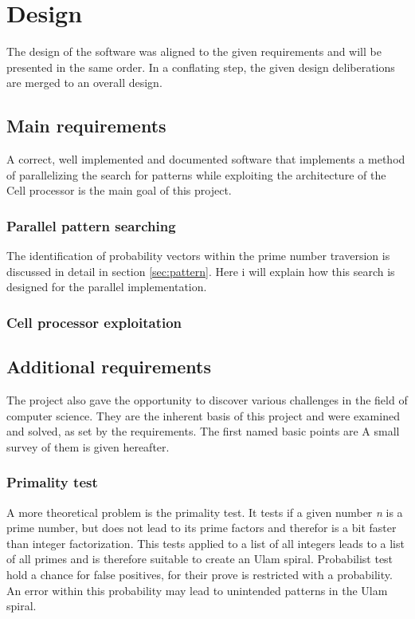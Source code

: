 \section{Design}
\label{sec:design}
The design of the software was aligned to the given requirements and will be presented in the same order. In a conflating step, the given design deliberations are merged to an overall design.

\subsection{Main requirements}
\label{sec:main_req}
A correct, well implemented and documented software that implements a method of parallelizing the search for patterns while exploiting the architecture of the Cell processor is the main goal of this project.

\subsubsection{Parallel pattern searching}
\label{sec:parallel_search}
The identification of probability vectors within the prime number traversion is discussed in detail in section \ref{sec:pattern}. Here i will explain how this search is designed for the parallel implementation.




\subsubsection{Cell processor exploitation}
\label{sec:cell_exploit}

\subsection{Additional requirements}
\label{sec:additional_req}
The project also gave the opportunity to discover various challenges in the field of computer science. They are the inherent basis of this project and were examined and solved, as set by the requirements. The first named basic points are A small survey of them is given hereafter.

\subsubsection{Primality test}
\label{sec:primality_test}
A more theoretical problem is the primality test. It tests if a given number \emph{n} is a prime number, but does not lead to its prime factors and therefor is a bit faster than integer factorization. This tests applied to a list of all integers leads to a list of all primes and is therefore suitable to create an Ulam spiral. Probabilist test hold a chance for false positives, for their prove is restricted with a probability. An error within this probability may lead to unintended patterns in the Ulam spiral.

